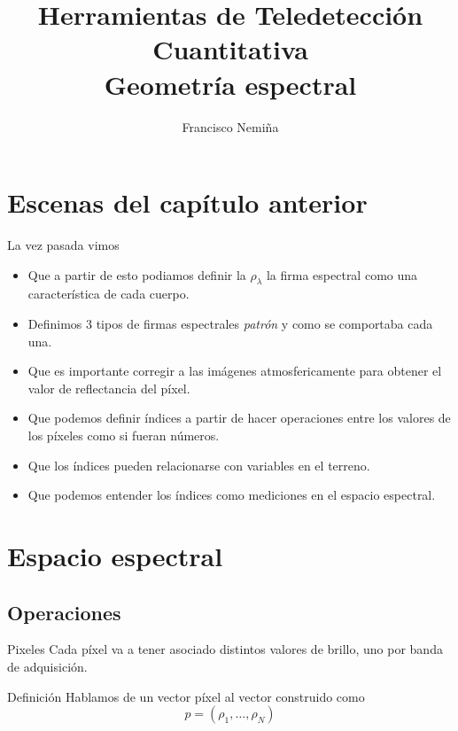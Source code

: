 \documentclass[handout]{beamer}
\title{Herramientas de Teledetección Cuantitativa\\{\small Geometría espectral}}
\author{Francisco Nemiña}
\institute{Unidad de Educación y Formación Masiva \\
Comisión Nacional de Actividades Espaciales}
\begin{document}
\begin{frame}
    \maketitle
\end{frame}

\section{Escenas del capítulo anterior}
\begin{frame}{La vez pasada vimos}
  \begin{itemize}[<+->]
    \item Que a partir de esto podiamos definir la $\rho_\lambda$ la firma espectral como una característica de cada cuerpo.
    \item Definimos 3 tipos de firmas espectrales \emph{patrón} y como se comportaba cada una.
    \item Que es importante corregir a las imágenes atmosfericamente para obtener el valor de reflectancia del píxel.
    \item Que podemos definir índices a partir de hacer operaciones entre los valores de los píxeles como si fueran números.
    \item Que los índices pueden relacionarse con variables en el terreno.
    \item Que podemos entender los índices como mediciones en el espacio espectral.
  \end{itemize}
\end{frame}

\section{Espacio espectral}
\subsection{Operaciones}
\begin{frame}{Pixeles}
  Cada píxel va a tener asociado distintos valores de brillo, uno por banda de adquisición. \pause
  \begin{block}{Definición}
    Hablamos de un vector píxel al vector construido como
    \begin{equation}
      p = (\rho_1, \ldots ,\rho_N)
    \end{equation}
  \end{block}
\end{frame}
\end{document}
